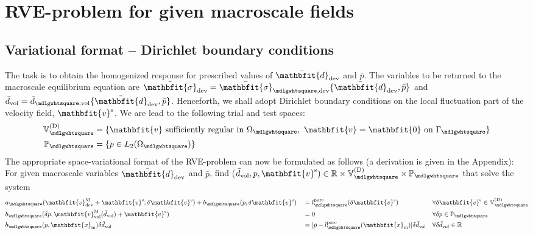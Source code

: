 \documentclass[10pt,a4paper]{article}
\renewcommand{\ta}[1]{\mathbfit{#1}}
\renewcommand{\ts}[1]{\mathbfit{#1}}
\renewcommand{\Box}{\mdlgwhtsquare}
\newcommand{\pore}{\mathrm{pore}}
\begin{document}
\section{RVE-problem for given macroscale fields}\label{sec:rve_problem}


\subsection{Variational format -- Dirichlet boundary conditions}

The task is to obtain the homogenized response for prescribed values of $\bar{\ts d}_\dev$ and $\bar{p}$. The variables to be returned to the macroscale equilibrium equation are $\bar{\ts\sigma}_\dev=\bar{\ts\sigma}_{\Box,\dev}\{\bar{\ts d}_\dev,\bar{p}\}$ and $\bar{d}_\vol=\bar{d}_{\Box,\vol}\{\bar{\ts d}_\dev, \bar{p}\}$. Henceforth, we shall adopt Dirichlet boundary conditions on the local fluctuation part of the velocity field, $\ta{v}^\fluct$. We are lead to the following trial and test spaces:
\begin{align}
    \set V_\Box^{(\Dirichlet)} &= \{\ta{v} \mbox{ sufficiently regular in } \Omega_\Box, \,\, \ta{v}=\ta{0}\,\,\mbox{on}\,\,\Gamma_\Box\}
\label{eq:rve_functions_v}\\
    \set{P}_\Box &= \{p\in L_2(\Omega_\Box)\}
\label{eq:rve_functions_p}
\end{align}
The appropriate space-variational format of the RVE-problem can now be formulated as follows (a derivation is given in the Appendix): For given macroscale variables $\bar{\ts d}_\dev$ and $\bar{p}$,
find ($\bar{d}_\vol,p,\ta{v}^\fluct)\in\set{R}\times\set{V}_\Box^{(\Dirichlet)}\times\set{P}_\Box$ that solve the system
\begin{align}
    \label{eq213a} & a_\Box(\ta{v}^\macro_\dev + \ta{v}^\fluct;\delta \ta{v}^\fluct) +  b_\Box(p,\delta\ta{v}^\fluct)
    && =
    l^\pore_\Box(\delta \ta{v}^\fluct)
    && \forall \delta \ta{v}^\fluct\in\set{V}_\Box^{(\Dirichlet)}
 \\
    \label{eq213b} & b_\Box(\delta p, \ta{v}^\macro_\vol(\bar{d}_\vol)+\ta{v}^\fluct)
    && =
    0
    && \forall \delta p\in\set{P}_\Box
\\
    \label{eq213c} & b_\Box(p,\ta{x}_\mean)\delta\bar{d}_\vol
    && =
    [\bar{p} - l_\Box^\pore(\ta{x}_\mean)]\delta\bar{d}_\vol
    && \forall \delta\bar{d}_\vol  \in \set{R}
\end{align}
\end{document}
